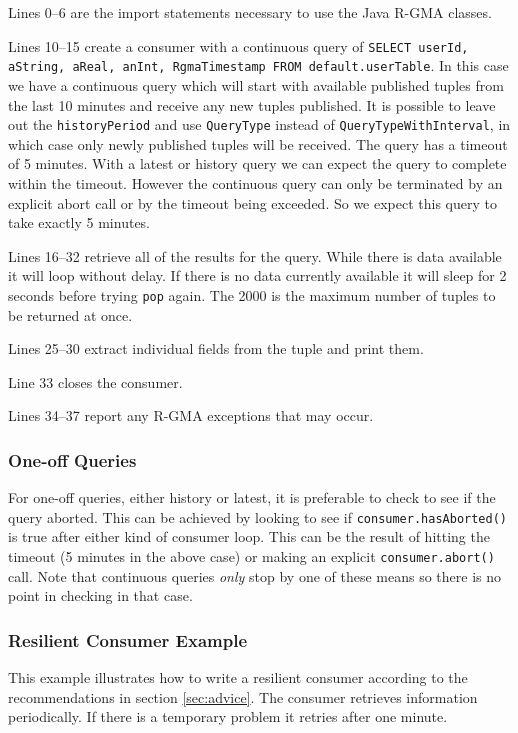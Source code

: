 Lines 0--6 are the import statements necessary to use the Java R-GMA
classes.

Lines 10--15 create a consumer with a continuous query
of \texttt{SELECT userId, aString, aReal, anInt, RgmaTimestamp FROM
default.userTable}. In this case we have a continuous query which will
start with available published tuples from the last 10 minutes and
receive any new tuples published. It is possible to leave out the
\texttt{historyPeriod} and use \texttt{QueryType}
instead of \texttt{QueryTypeWithInterval}, in which case only newly
published tuples will be received. The query has a timeout of 5
minutes. With a latest or history query we can expect the query to
complete within the timeout. However the continuous query can only be
terminated by an explicit abort call or by the timeout being
exceeded. So we expect this query to take exactly 5 minutes.

Lines 16--32 retrieve all of the results for the query. While there is
data available it will loop without delay. If there is no data
currently available it will sleep for 2 seconds before trying
\texttt{pop} again. The 2000 is the maximum number of tuples to be
returned at once.

Lines 25--30 extract individual fields from the tuple and print them.

Line 33 closes the consumer.

Lines 34--37 report any R-GMA exceptions that may occur.

\subsubsection {One-off Queries}
For one-off queries, either history or latest, it is preferable to
check to see if the query aborted. This can be achieved by looking to
see if \texttt{consumer.hasAborted()} is true after either kind of
consumer loop. This can be the result of hitting the timeout (5
minutes in the above case) or making an
explicit \texttt{consumer.abort()} call. Note that continuous
queries \emph{only} stop by one of these means so there is no point in
checking in that case.

\subsubsection{Resilient Consumer Example}
This example illustrates how to write a resilient consumer according
to the recommendations in section \ref{sec:advice}.  The consumer
retrieves information periodically. If there is a temporary problem it
retries after one minute.

